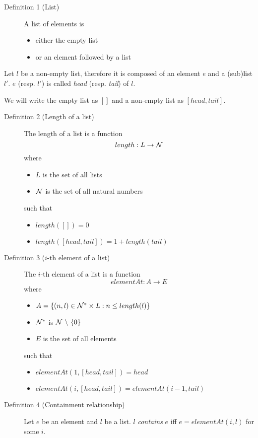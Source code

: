 \documentclass{article}
\begin{document}
\begin{description}
\item[Definition 1 (List)] A list of elements is
  \begin{itemize}
	\item either the empty list
	\item or an element followed by a list
  \end{itemize}
\end{description}

Let $l$ be a non-empty list, therefore it is composed of an element $e$ and a (sub)list $l'$. $e$ (resp. $l'$) is called \textit{head} (resp. \textit{tail}) of $l$.

We will write the empty list as $[]$ and a non-empty list as $[head, tail]$.

\begin{description}
\item[Definition 2 (Length of a list)] The length of a list is a function
  \begin{displaymath}
  length: L \rightarrow {\cal N}
  \end{displaymath}
  where
  \begin{itemize}
	\item $L$ is the set of all lists
	\item ${\cal N}$ is the set of all natural numbers
  \end{itemize}
  such that
  \begin{itemize}
	\item $length([])=0$
	\item $length([head, tail])=1+length(tail)$
  \end{itemize}
\item[Definition 3 ($i$-th element of a list)] The $i$-th element of a list is a function
  \begin{displaymath}
  elementAt: A \rightarrow E
  \end{displaymath}
  where
  \begin{itemize}
	\item $A = \{ (n, l) \in {\cal N}^{*} \times L : n \leq length(l) \}$
	\item ${\cal N}^{*}$ is ${\cal N}\ \backslash \ \{0\}$
	\item $E$ is the set of all elements
  \end{itemize}
	such that
  \begin{itemize}
	\item $elementAt(1, [head, tail])=head$
	\item $elementAt(i, [head, tail])=elementAt(i-1, tail)$
  \end{itemize}
\item[Definition 4 (Containment relationship)] Let $e$ be an element and $l$ be a list. $l$ \textit{contains} $e$ iff $e=elementAt(i, l)$ for some $i$.
\end{description}
\end{document}
